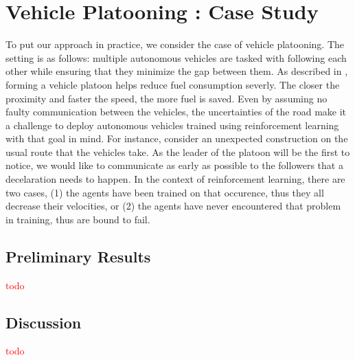 \documentclass[a4paper,11pt]{article}
\begin{document}
\section{Vehicle Platooning : Case Study} \label{vehicleplat}
To put our approach in practice, we consider the case of vehicle platooning. The setting is as follows: multiple autonomous vehicles 
are tasked with following each other while ensuring that they minimize the gap between them. 
As described in \cite{LarssonErik2015Tvpp}, forming a vehicle platoon helps reduce fuel consumption severly. The closer the proximity and faster the speed, the more fuel is saved. 
Even by assuming no faulty communication between the vehicles, the uncertainties of the road make it a challenge to deploy autonomous vehicles trained using reinforcement learning 
with that goal in mind. For instance, consider an unexpected construction on the usual route that the vehicles take. 
As the leader of the platoon will be the first to notice, we would like to communicate as early as possible to the followers that a decelaration needs to happen. 
In the context of reinforcement learning, there are two cases, (1) the agents have been trained on that occurence, thus they all decrease their velocities, or 
(2) the agents have never encountered that problem in training, thus are bound to fail. 

\medskip 


\subsection{Preliminary Results}
\textcolor{red}{todo}
\subsection{Discussion}
\textcolor{red}{todo}
\end{document}
